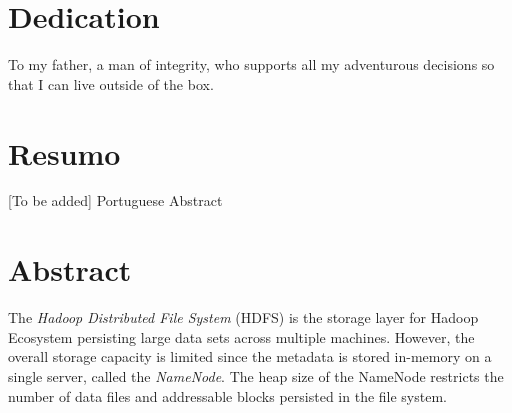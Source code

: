 \cleardoublepage


\chapter*{Dedication}
\thispagestyle{empty}

\vfill
\mbox{}
\vfill\Large
\begin{flushright}
  \begin{minipage}{8cm}
    \begin{center}
	To my father, a man of integrity, who supports all my adventurous decisions so that I can live outside of the box.

    \end{center}
  \end{minipage}
\end{flushright}
\normalsize\vfill

\cleardoublepage


\chapter*{Resumo}
\thispagestyle{empty}

[To be added] Portuguese Abstract

\newpage


\chapter*{Abstract}
\thispagestyle{empty}

The \textit{Hadoop Distributed File System} (HDFS) is the storage layer for Hadoop Ecosystem persisting large data sets across multiple machines. However, the overall storage capacity is limited since the metadata is stored in-memory on a single server, called the \textit{NameNode}. The heap size of the NameNode restricts the number of data files and addressable blocks persisted in the file system.~\cite{shvachko2010hdfs}

